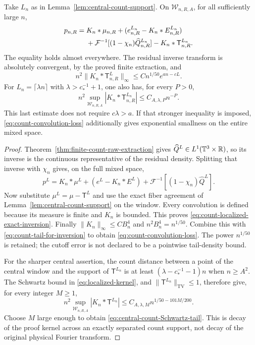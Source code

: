 \begin{theorem}
\label{thm:finite-extraction-central-inversion}
Take $L_n$ as in Lemma~\ref{lem:central-count-support}. On
$\mathcal W_{n,R,A}$, for all sufficiently large $n$,
\begin{align}
 p_{n,R}={}&K_n*\mu_{n,R}
       +(e^{L_n}_{n,R}-K_n*E^{L_n}_{n,R})\notag\\
 &+\mathcal F^{-1}
       [(1-\chi_n)\widehat Q^{L_n}_{n,R}]
       -K_n*\mathsf T^{L_n}_{n,R}.
 \label{eq:count-localized-exact-inversion}
\end{align}
The equality holds almost everywhere. The residual inverse transform
is absolutely convergent, by the proved finite extraction, and
\begin{equation}\label{eq:count-convolution-loss}
 n^2\|K_n*\mathsf T^{L}_{n,R}\|_\infty
          \le C n^{1/50}e^{an-cL}.
\end{equation}
For $L_n=\lceil\lambda n\rceil$ with $\lambda>c_*^{-1}+1$, one also
has, for every $P>0$,
\begin{equation}\label{eq:central-count-Schwartz-tail}
 n^2\sup_{\mathcal W_{n,R,A}}
        |K_n*\mathsf T^{L_n}_{n,R}|\le C_{A,\lambda,P}n^{-P}.
\end{equation}
This last estimate does not require $c\lambda>a$. If that stronger
inequality is imposed, \eqref{eq:count-convolution-loss} additionally
gives exponential smallness on the entire mixed space.
\end{theorem}
\begin{proof}
Theorem~\ref{thm:finite-count-raw-extraction} gives
$\widehat Q^L\in L^1(\mathbb T^3\times\mathbb R)$, so its inverse is the continuous
representative of the residual density. Splitting that inverse with
$\chi_n$ gives, on the full mixed space,
\[
 p^L=K_n*\mu^L+(e^L-K_n*E^L)
              +\mathcal F^{-1}[(1-\chi_n)\widehat Q^L].
\]
Now substitute $\mu^L=\mu-\mathsf T^L$ and use the exact fiber
agreement of Lemma~\ref{lem:central-count-support} on the window.
Every convolution is defined because its measure is finite and $K_n$
is bounded. This proves \eqref{eq:count-localized-exact-inversion}.
Finally $\|K_n\|_\infty\le CB_n^4$ and
$n^2B_n^4=n^{1/50}$. Combine this with
\eqref{eq:count-tail-for-inversion} to obtain
\eqref{eq:count-convolution-loss}. The power $n^{1/50}$ is retained;
the cutoff error is not declared to be a pointwise tail-density bound.

For the sharper central assertion, the count distance between a point
of the central window and the support of $\mathsf T^{L_n}$ is at least
$(\lambda-c_*^{-1}-1)n$ when $n\ge A^2$. The Schwartz bound in
\eqref{eq:localized-kernel}, and $\|\mathsf T^{L_n}\|_{\mathrm{TV}}\le1$,
therefore give, for every integer $M\ge1$,
\[
 n^2\sup_{\mathcal W_{n,R,A}}|K_n*\mathsf T^{L_n}|
       \le C_{A,\lambda,M} n^{1/50-101M/200}.
\]
Choose $M$ large enough to obtain \eqref{eq:central-count-Schwartz-tail}.
This is decay of the proof kernel across an exactly separated count
support, not decay of the original physical Fourier transform.
\end{proof}

